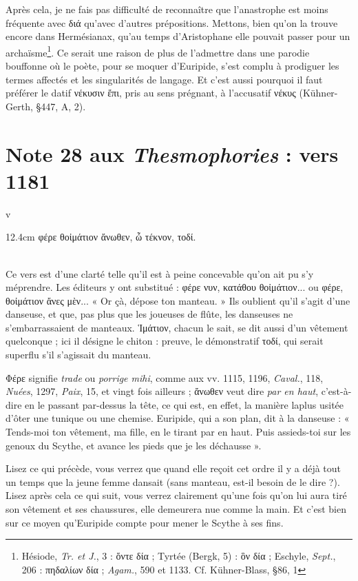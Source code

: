 \documentclass{book}%
\newcommand{\italique}[1]{\textit{#1}}%
\newcommand{\espace}[1]{\hspace{#1}}%
\newcommand{\fantome}{{\color{white}v}}
\newcommand{\Note}[1]{\section*{#1}%
\addcontentsline{toc}{section}{#1}}
\newcommand{\note}[1]{\footnote{#1}}
\newcommand{\citComm}[1]{\fantome\\
\espace{1cm}\begin{minipagewithmarginpars}{12.4cm}%
#1
\end{minipagewithmarginpars}%
}
\begin{document}
Après cela, je ne fais pas difficulté de reconnaître que l'anastrophe est moins fréquente avec διά qu'avec d'autres prépositions. Mettons, bien qu'on la trouve encore dans Hermésianax, qu'au temps d'Aristophane elle pouvait passer pour un archaïsme\note{Hésiode, \italique{Tr. et J.}, 3 : ὅντε δία ; Tyrtée (Bergk, 5) : ὃν δία ; Eschyle, \italique{Sept.}, 206 : πηδαλίων δία ; \italique{Agam.}, 590 et 1133. Cf. Kühner-Blass, §86, 1}. Ce serait une raison de plus de l'admettre dans une parodie bouffonne où le poète, pour se moquer d'Euripide, s'est complu à prodiguer les termes affectés et les singularités de langage. Et c'est aussi pourquoi il faut préférer le datif νέκυσιν ἔπι, pris au sens prégnant, à l'accusatif νέκυς (Kühner-Gerth, §447, A, 2).

\Note{Note 28 aux \italique{Thesmophories} : vers 1181}

\citComm{φέρε θοἰμάτιον ἄνωθεν, ὦ τέκνον, τοδί.}\\

Ce vers est d'une clarté telle qu'il est à peine concevable qu'on ait pu s'y méprendre. Les éditeurs y ont substitué : φέρε νυν, κατάθου θοἰμάτιον...  ou φέρε, θοἰμάτιον ἄνες μὲν... « Or çà, dépose ton manteau. » 
Ils oublient qu'il s'agit d'une danseuse, et que, pas plus que les joueuses de flûte, les danseuses ne s'embarrassaient de manteaux. Ἱμάτιον, chacun le sait, se dit aussi d'un vêtement quelconque ; ici il désigne le chiton : preuve, le démonstratif τοδί, qui serait superflu s'il s'agissait du manteau. 

Φέρε signifie \italique{trade} ou \italique{porrige mihi}, comme aux vv. 1115, 1196, \italique{Caval.}, 118, \italique{Nuées}, 1297, \italique{Paix}, 15, et vingt fois ailleurs ; ἄνωθεν veut dire \italique{par en haut}, c'est-à-dire en le passant par-dessus la tête, ce qui est, en effet, la manière laplus usitée d'ôter une tunique ou une chemise. Euripide, qui a son plan, dit à la danseuse : « Tends-moi ton vêtement, ma fille, en le tirant par en haut. Puis assieds-toi sur les genoux du Scythe, et avance les pieds que je les déchausse ». 

Lisez ce qui précède, vous verrez que quand elle reçoit cet ordre il y a déjà tout un temps que la jeune femme dansait (sans manteau, est-il besoin de le dire ?). Lisez après cela ce qui suit, vous verrez clairement qu'une fois qu'on lui aura tiré son vêtement et ses chaussures, elle demeurera nue comme la main. Et c'est bien sur ce moyen qu'Euripide compte pour mener le Scythe à ses fins. 
\end{document}
